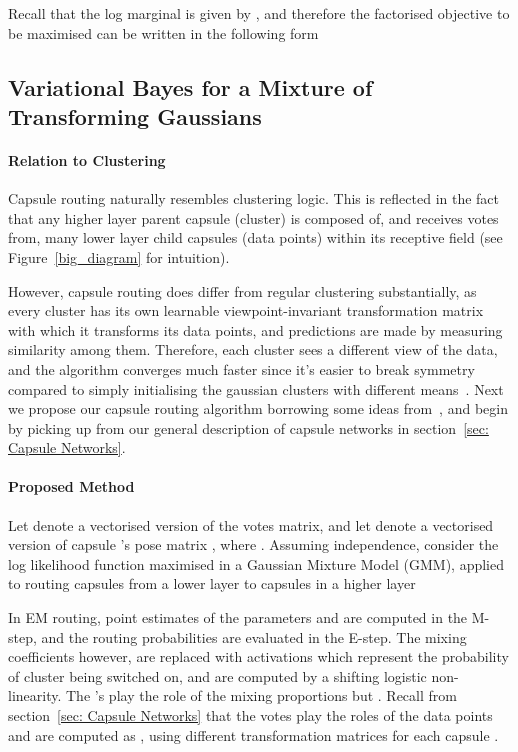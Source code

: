\documentclass[letterpaper]{article} \usepackage{aaai20}  \usepackage{times}  \usepackage{helvet} \usepackage{courier}  \usepackage[hyphens]{url}  \usepackage{graphicx} \urlstyle{rm} \def\UrlFont{\rm}  \usepackage{graphicx}  \frenchspacing  \setlength{\pdfpagewidth}{8.5in}  \setlength{\pdfpageheight}{11in}  \nocopyright
\begin{document}
Recall that the log marginal is given by , and therefore the factorised objective to be maximised can be written in the following form

\subsection{Variational Bayes for a Mixture of Transforming Gaussians}\label{subsec: Variational Bayes for a Mixture of Transforming Gaussians}
\paragraph{Relation to Clustering} Capsule routing naturally resembles clustering logic. This is reflected in the fact that any higher layer parent capsule  (cluster) is composed of, and receives votes from, many lower layer child capsules  (data points) within its receptive field (see Figure~\ref{big_diagram} for intuition). 

However, capsule routing does differ from regular clustering substantially, as every cluster has its own learnable viewpoint-invariant transformation matrix  with which it transforms its data points, and predictions are made by measuring similarity among them. Therefore, each cluster sees a different view of the data, and the algorithm converges much faster since it's easier to break symmetry compared to simply initialising the gaussian clusters with different means~\cite{hinton2018matrix}. Next we propose our capsule routing algorithm borrowing some ideas from~\cite{bishop2006pattern}, and begin by picking up from our general description of capsule networks in section~\ref{sec: Capsule Networks}. 
\paragraph{Proposed Method}
Let  denote a vectorised version of the  votes  matrix, and let  denote a vectorised version of capsule 's  pose matrix , where . Assuming independence, consider the log likelihood function maximised in a Gaussian Mixture Model (GMM), applied to routing capsules  from a lower layer to capsules  in a higher layer

In EM routing, point estimates of the parameters  and  are computed in the M-step, and the routing probabilities  are evaluated in the E-step. The mixing coefficients  however, are replaced with activations  which represent the probability of cluster  being switched on, and are computed by a shifting logistic non-linearity. The 's play the role of the mixing proportions but . Recall from section~\ref{sec: Capsule Networks} that the votes play the roles of the data points and are computed as , using different transformation matrices 
 for each capsule .
\end{document}
